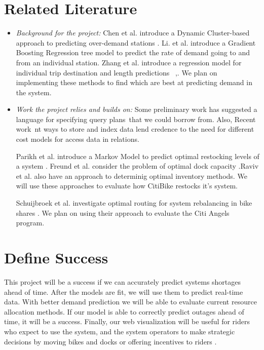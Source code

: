 \documentclass{proc}
\begin{document}
\section{Related Literature}


\begin{itemize}
\item \emph{Background for the project:} Chen et al. introduce a Dynamic Cluster-based approach to predicting over-demand stations \cite{chen}.  Li. et al. introduce a Gradient Boosting Regression tree model to predict the rate of demand going to and from an individual station.  Zhang et al. introduce a regression model for individual trip destination and length predictions~ \cite{zhang},. We plan on implementing these methods to find which are best at predicting demand in the system.





\item \emph{Work the project relies and builds on: } Some preliminary work has suggested a language for specifying query plans~that we could borrow from.  Also, Recent work~nt ways to store and index data lend credence to the need for different cost models for access data in relations.



Parikh et al. introduce a Markov Model to predict optimal restocking levels of a system \cite{parikh}. Freund et al. consider the problem of optimal dock capacity \cite{freund}.Raviv et al. also have an approach to determinig optimal inventory methods. We will use these approaches to evaluate how CitiBike restocks it's system.

Schuijbroek et al. investigate optimal routing for system rebalancing in bike shares \cite{schu}. We plan on using their approach to evaluate the Citi Angels program.
\end{itemize}


\section{Define Success}


This project will be a success if we can accurately predict systems shortages ahead of time. After the models are fit, we will use them to predict real-time data. With better demand prediction we will be able to evaluate current resource allocation methods. If our model is able to correctly predict outages ahead of time, it will be a success.  Finally, our web visualization will be useful for riders who expect to use the system, and the system operators to make strategic decisions by moving bikes and docks or offering incentives to riders
.
\end{document}
